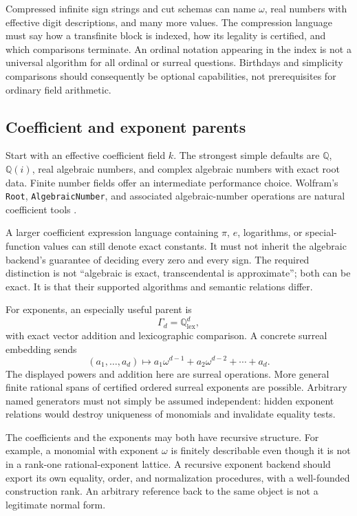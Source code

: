 \documentclass[11pt,letterpaper]{article}
\theoremstyle{definition}\newtheorem{definition}[theorem]{Definition}
\theoremstyle{remark}\newtheorem{remark}[theorem]{Remark}
\newcommand{\Q}{\mathbb Q}\newcommand{\N}{\mathbb N}\newcommand{\Z}{\mathbb Z}
\newcommand{\code}[1]{\texttt{#1}}
\numberwithin{equation}{section}\setcounter{tocdepth}{2}
\begin{document}
Compressed infinite sign strings and cut schemas can name $\omega$, real numbers with effective digit descriptions, and many more values. The compression language must say how a transfinite block is indexed, how its legality is certified, and which comparisons terminate. An ordinal notation appearing in the index is not a universal algorithm for all ordinal or surreal questions. Birthdays and simplicity comparisons should consequently be optional capabilities, not prerequisites for ordinary field arithmetic.

\subsection{Coefficient and exponent parents}
Start with an effective coefficient field $k$. The strongest simple defaults are $\Q$, $\Q(i)$, real algebraic numbers, and complex algebraic numbers with exact root data. Finite number fields offer an intermediate performance choice. Wolfram's \code{Root}, \code{AlgebraicNumber}, and associated algebraic-number operations are natural coefficient tools \cite{WLRoot,WLAlgebraic}.

A larger coefficient expression language containing $\pi$, $e$, logarithms, or special-function values can still denote exact constants. It must not inherit the algebraic backend's guarantee of deciding every zero and every sign. The required distinction is not ``algebraic is exact, transcendental is approximate''; both can be exact. It is that their supported algorithms and semantic relations differ.

For exponents, an especially useful parent is
\begin{equation}\label{eq:lexgroup}
 \Gamma_d=\Q^d_{\mathrm{lex}},
\end{equation}
with exact vector addition and lexicographic comparison. A concrete surreal embedding sends
\[
 (a_1,\ldots,a_d)\longmapsto
 a_1\omega^{d-1}+a_2\omega^{d-2}+\cdots+a_d.
\]
The displayed powers and addition here are surreal operations. More general finite rational spans of certified ordered surreal exponents are possible. Arbitrary named generators must not simply be assumed independent: hidden exponent relations would destroy uniqueness of monomials and invalidate equality tests.

The coefficients and the exponents may both have recursive structure. For example, a monomial with exponent $\omega$ is finitely describable even though it is not in a rank-one rational-exponent lattice. A recursive exponent backend should export its own equality, order, and normalization procedures, with a well-founded construction rank. An arbitrary reference back to the same object is not a legitimate normal form.
\end{document}
